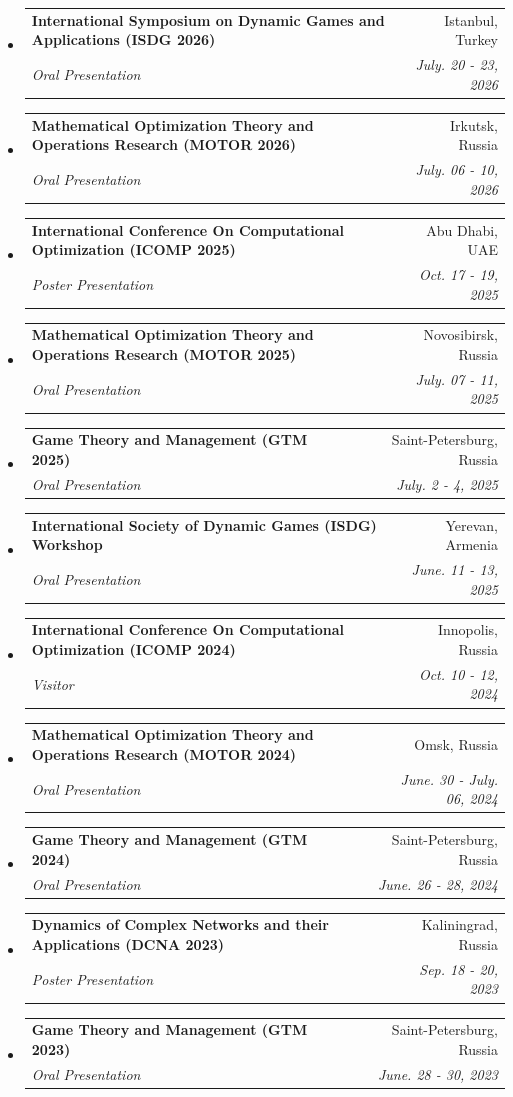 \documentclass[letterpaper,10pt]{article}
\makeatletter
\newcommand{\resumeSubheading}[4]{
  \vspace{-2pt}\item
  \begin{tabular*}{0.97\textwidth}[t]{l@{\extracolsep{\fill}}r}
    \textbf{#1} & #2 \\
    \textit{\small#3} & \textit{\small #4} \\
  \end{tabular*}\vspace{-7pt}
}
\newenvironment{resumeSubHeadingList}{\begin{itemize}[leftmargin=0.15in, label={}]}{\end{itemize}}
\makeatother
\begin{document}
\begin{resumeSubHeadingList}
  \resumeSubheading{\nth{21} International Symposium on Dynamic Games and Applications (ISDG 2026)}{Istanbul, Turkey}{Oral Presentation}{July. 20 - 23, 2026}
  \resumeSubheading{Mathematical Optimization Theory and Operations Research
                    (MOTOR 2026)}{Irkutsk, Russia}{Oral Presentation}{July. 06
                    - 10, 2026}
  \resumeSubheading{International Conference On Computational Optimization
                    (ICOMP 2025)}{Abu Dhabi, UAE}{Poster Presentation}{Oct. 17
                    - 19, 2025}
  \resumeSubheading{Mathematical Optimization Theory and Operations Research
                    (MOTOR 2025)}{Novosibirsk, Russia}{Oral Presentation}{July.
                    07 - 11, 2025}
  \resumeSubheading{Game Theory and Management (GTM 2025)}{Saint-Petersburg,
                    Russia}{Oral Presentation}{July. 2 - 4, 2025}
  \resumeSubheading{\nth{14} International Society of Dynamic Games (ISDG) Workshop}{Yerevan, Armenia}{Oral Presentation}{June. 11 - 13, 2025}
  \resumeSubheading{International Conference On Computational Optimization
                    (ICOMP 2024)}{Innopolis, Russia}{Visitor}{Oct. 10 - 12,
                    2024}
  \resumeSubheading{Mathematical Optimization Theory and Operations Research
                    (MOTOR 2024)}{Omsk, Russia}{Oral Presentation}{June. 30 -
                    July. 06, 2024}
  \resumeSubheading{Game Theory and Management (GTM 2024)}{Saint-Petersburg,
                    Russia}{Oral Presentation}{June. 26 - 28, 2024}
  \resumeSubheading{Dynamics of Complex Networks and their Applications (DCNA
                    2023)}{Kaliningrad, Russia}{Poster Presentation}{Sep. 18 -
                    20, 2023}
  \resumeSubheading{Game Theory and Management (GTM 2023)}{Saint-Petersburg,
                    Russia}{Oral Presentation}{June. 28 - 30, 2023}
\end{resumeSubHeadingList}
\end{document}
